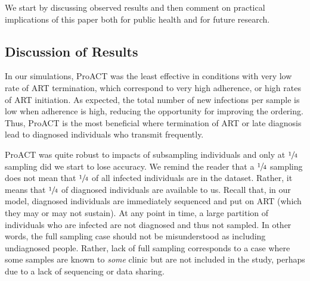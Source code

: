 \documentclass[a4paper,11pt]{article}
\newcommand{\PLWH}{sample\xspace}
\begin{document}
We start by discussing observed results and then comment on practical implications of this paper both for public health and for future research. 


\subsection{Discussion of Results}

In our simulations, ProACT was the least effective in conditions with very low rate of ART termination, which correspond to very high adherence, or high rates of ART initiation.
As expected, the total number of new infections per  \PLWH is low when adherence is high,  reducing the opportunity for improving the ordering.
Thus, ProACT is the most beneficial  where termination of ART or late diagnosis lead to diagnosed individuals who transmit frequently. 

ProACT was quite robust to impacts of subsampling individuals and only at $\sfrac{1}{4}$ sampling did we start to lose accuracy.
We remind the reader that a $\sfrac{1}{4}$ sampling does not mean that $\sfrac{1}{4}$ of all infected individuals are in the dataset. 
Rather, it means that $\sfrac{1}{4}$ of diagnosed individuals  are available to us. Recall that, in our model, diagnosed individuals are immediately  sequenced and put on ART (which they may or may not sustain). 
At any point in time, a large partition of individuals who are infected are not diagnosed and thus not sampled. 
In other words, the full sampling case should not be misunderstood as including undiagnosed people.
 Rather, lack of full sampling corresponds to a case where some \PLWH{s} are known to {\em some} clinic but are not included in the study, perhaps due to a lack of sequencing or data sharing. 
\end{document}
